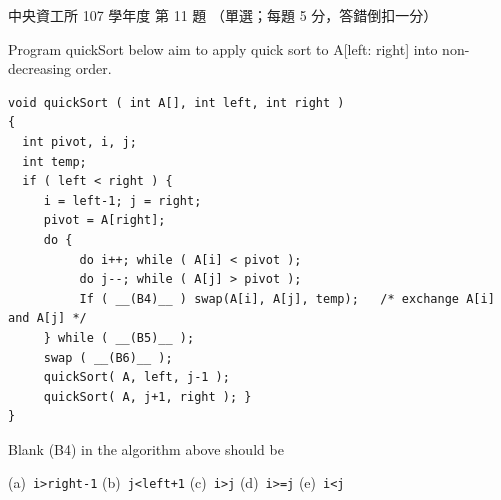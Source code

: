 \begin{pastexam}[label={px:ncu-107-dsa-11}]{中央資工所 107 學年度 第 11 題}
（單選；每題 5 分，答錯倒扣一分）

Program quickSort below aim to apply quick sort to A[left: right] into non-decreasing order.
\begin{verbatim}
void quickSort ( int A[], int left, int right )
{
  int pivot, i, j;
  int temp;
  if ( left < right ) {
     i = left-1; j = right;
     pivot = A[right];
     do {
          do i++; while ( A[i] < pivot );
          do j--; while ( A[j] > pivot );
          If ( __(B4)__ ) swap(A[i], A[j], temp);   /* exchange A[i] and A[j] */
     } while ( __(B5)__ );
     swap ( __(B6)__ );
     quickSort( A, left, j-1 );
     quickSort( A, j+1, right ); }
}
\end{verbatim}

Blank (B4) in the algorithm above should be

(a)~\texttt{i>right-1} \qquad (b)~\texttt{j<left+1} \qquad (c)~\texttt{i>j} \qquad (d)~\texttt{i>=j} \qquad (e)~\texttt{i<j}
\end{pastexam}


